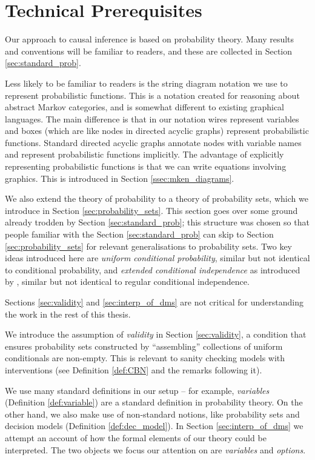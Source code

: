 

\chapter{Technical Prerequisites}\label{ch:tech_prereq}

Our approach to causal inference is based on probability theory. Many results and conventions will be familiar to readers, and these are collected in Section \ref{sec:standard_prob}.

Less likely to be familiar to readers is the string diagram notation we use to represent probabilistic functions. This is a notation created for reasoning about abstract Markov categories, and is somewhat different to existing graphical languages. The main difference is that in our notation wires represent variables and boxes (which are like nodes in directed acyclic graphs) represent probabilistic functions. Standard directed acyclic graphs annotate nodes with variable names and represent probabilistic functions implicitly. The advantage of explicitly representing probabilistic functions is that we can write equations involving graphics. This is introduced in Section \ref{ssec:mken_diagrams}.

We also extend the theory of probability to a theory of probability sets, which we introduce in Section \ref{sec:probability_sets}. This section goes over some ground already trodden by Section \ref{sec:standard_prob}; this structure was chosen so that people familiar with the Section \ref{sec:standard_prob} can skip to Section \ref{sec:probability_sets} for relevant generalisations to probability sets. Two key ideas introduced here are \emph{uniform conditional probability}, similar but not identical to conditional probability, and \emph{extended conditional independence} as introduced by \citet{constantinou_extended_2017}, similar but not identical to regular conditional independence.

Sections \ref{sec:validity} and \ref{sec:interp_of_dms} are not critical for understanding the work in the rest of this thesis. 

We introduce the assumption of \emph{validity} in Section \ref{sec:validity}, a condition that ensures probability sets constructed by ``assembling'' collections of uniform conditionals are non-empty. This is relevant to sanity checking models with interventions (see Definition \ref{def:CBN} and the remarks following it).

We use many standard definitions in our setup -- for example, \emph{variables} (Definition \ref{def:variable}) are a standard definition in probability theory. On the other hand, we also make use of non-standard notions, like probability sets and decision models (Definition \ref{def:dec_model}). In Section \ref{sec:interp_of_dms} we attempt an account of how the formal elements of our theory could be interpreted. The two objects we focus our attention on are \emph{variables} and \emph{options}.

